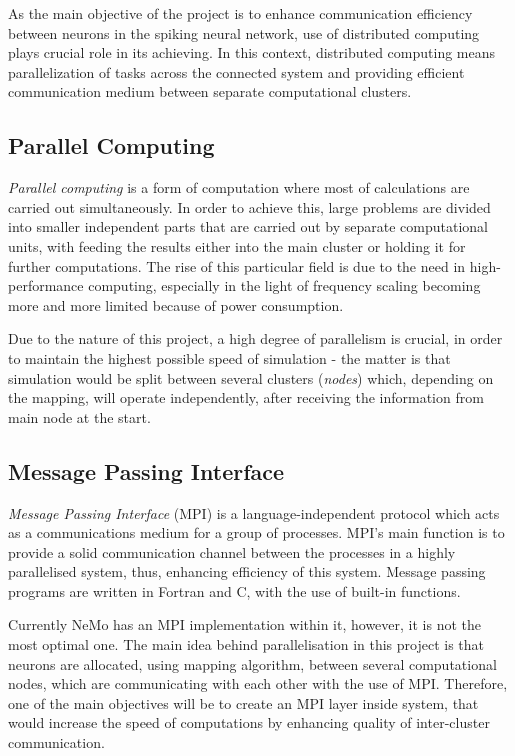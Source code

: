 As the main objective of the project is to enhance communication efficiency between neurons in the spiking neural network, use of distributed computing plays crucial
role in its achieving. In this context, distributed computing means parallelization of tasks across the connected system and providing efficient communication medium
between separate computational clusters.

\subsection{Parallel Computing}

\emph{Parallel computing} is a form of computation where most of calculations are carried out simultaneously.\cite{G.S.Almasi1989} In order to achieve this, large problems
are divided into smaller independent parts that are carried out by separate computational units, with feeding the results either into the main cluster or holding it for further
computations. The rise of this particular field is due to the need in high-performance computing, especially in the light of frequency scaling becoming more and more
limited because of power consumption.\cite{Kumar2002}

Due to the nature of this project, a high degree of parallelism is crucial, in order to maintain the highest possible speed of simulation - the matter is that simulation would
be split between several clusters (\emph{nodes}) which, depending on the mapping, will operate independently, after receiving the information from main node at the start.

\subsection{Message Passing Interface}

\emph{Message Passing Interface} (MPI) is a language-independent protocol which acts as a communications medium for a group of processes.\cite{mpi} MPI's main function is to provide
a solid communication channel between the processes in a highly parallelised system, thus, enhancing efficiency of this system. Message passing programs are written in Fortran and 
C, with the use of built-in functions.

Currently NeMo has an MPI implementation within it, however, it is not the most optimal one. The main idea behind parallelisation in this project is that neurons are allocated, 
using mapping algorithm, between several computational nodes, which are communicating with each other with the use of MPI. Therefore, one of the main objectives will be to 
create an MPI layer inside system, that would increase the speed of computations by enhancing quality of inter-cluster communication.

